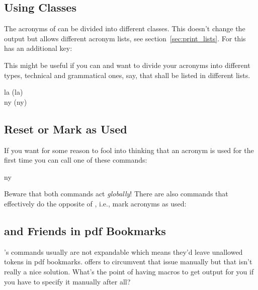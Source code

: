 \documentclass[DIV10,toc=index,toc=bib,hyperfootnotes=false]{cnpkgdoc}
\makeatletter
\newcommand*\sinceversion[1]{%
  \@bsphack
  \marginnote{%
    \footnotesize\sffamily\RaggedRight
    \textcolor{black!75}{Introduced in version~#1}}%
  \@esphack}
\makeatother
\begin{document}
\subsection{Using Classes}
The acronyms of \acro can be divided into different classes. This doesn't change
the output but allows different acronym lists, see section~\ref{sec:print_lists}.
For this  has an additional key:
\begin{beschreibung}
\end{beschreibung}

This might be useful if you can and want to divide your acronyms into different
types, technical and grammatical ones, say, that shall be listed in different
lists.

\begin{beispiel}
 \acl{la} (\acs{la}) \\
 \acl{ny} (\acs{ny})
\end{beispiel}

\subsection{Reset or Mark as Used}
If you want for some reason to fool \acro into thinking that an acronym is used
for the first time you can call one of these commands:
\begin{beschreibung}
 \sinceversion{0.5}
\end{beschreibung}
\begin{beispiel}
 \ac{ny}
\end{beispiel}
Beware that both commands act \emph{globally}! There are also commands that
effectively do the opposite of , i.e., mark acronyms as used:
\begin{beschreibung}
 \sinceversion{0.5}
 \sinceversion{0.6a}
\end{beschreibung}

\subsection{ and Friends in \acs*{pdf} Bookmarks}
\noindent\sinceversion{0.5}\acro's commands usually are not expandable which
means they'd leave unallowed tokens in \acs{pdf} bookmarks. 
offers  to circumvent that issue manually but that isn't
really a nice solution. What's the point of having macros to get output for you
if you have to specify it manually after all?
\end{document}
